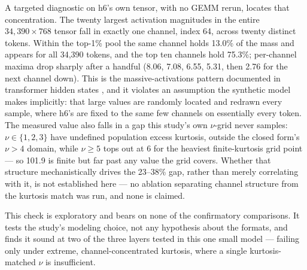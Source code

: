 A targeted diagnostic on h6's own tensor, with no GEMM rerun, locates that
concentration. The twenty largest activation magnitudes in the entire
$34{,}390 \times 768$ tensor fall in exactly one channel, index 64, across twenty
distinct tokens. Within the top-1\% pool the same channel holds 13.0\% of
the mass and appears for all 34,390 tokens, and the top ten channels hold
75.3\%; per-channel maxima drop sharply after a handful (8.06, 7.08, 6.55, 5.31,
then 2.76 for the next channel down). This is
the massive-activations pattern documented in transformer hidden states
\citep{sun2024massive}, and it violates an assumption the synthetic model makes
implicitly: that large values are randomly located and redrawn every sample,
where h6's are fixed to the same few channels on essentially every token. The
measured value also falls in a gap this study's own $\nu$-grid never samples:
$\nu \in \{1, 2, 3\}$ have undefined population excess kurtosis, outside the
closed form's $\nu > 4$ domain, while $\nu \ge 5$ tops out at 6 for the heaviest
finite-kurtosis grid point --- so 101.9 is finite but far past any value the grid
covers. Whether that structure mechanistically drives the 23--38\% gap, rather
than merely correlating with it, is not established here --- no ablation
separating channel structure from the kurtosis match was run, and none is
claimed.

This check is exploratory and bears on none of the confirmatory comparisons. It
tests the study's modeling choice, not any hypothesis about the formats, and
finds it sound at two of the three layers tested in this one small model ---
failing only under extreme, channel-concentrated kurtosis, where a single
kurtosis-matched $\nu$ is insufficient.
